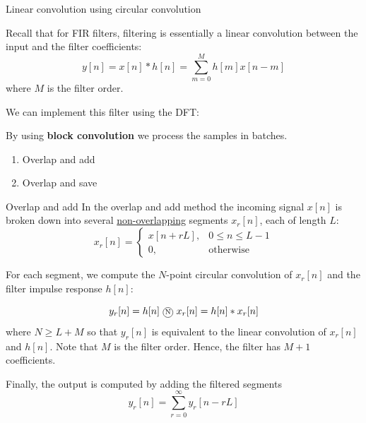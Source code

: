 \documentclass[10pt, handout]{beamer}
\begin{document}
\begin{frame}{Linear convolution using circular convolution}

	Recall that for FIR filters, filtering is essentially a linear convolution between the input and the filter coefficients:
	\begin{equation*}
		y[n] = x[n] \ast h[n] = \sum_{m =0}^{M} h[m]x[n-m]
	\end{equation*}
	where $M$ is the filter order.
	
	\vspace{0.25cm}
	We can implement this filter using the DFT:
	\begin{center}
		\resizebox{0.8\textwidth}{!}{}
	\end{center}

	By using \textbf{block convolution} we process the samples in batches.
	\begin{enumerate}
		\item Overlap and add
		\item Overlap and save
	\end{enumerate}
\end{frame}


\begin{frame}{Overlap and add}
In the overlap and add method the incoming signal $x[n]$ is broken down into several \underline{non-overlapping} segments $x_r[n]$, each of length $L$:
\begin{equation*}
	x_r[n] = \begin{cases}
	x[n + rL], & 0 \leq n \leq L-1\\
	0, & \text{otherwise}
	\end{cases}
\end{equation*}

For each segment, we compute the $N$-point circular convolution of $x_r[n]$ and the filter impulse response $h[n]$:

\begin{equation*}
	y_r[n] = h[n]~\encircle{N}~x_r[n] = h[n]\ast x_r[n]
\end{equation*}
where $N \geq L + M$ so that $y_r[n]$ is equivalent to the linear convolution of $x_r[n]$ and $h[n]$. Note that $M$ is the filter order. Hence, the filter has $M+1$ coefficients.

Finally, the output is computed by adding the filtered segments
\begin{equation*}
	y_r[n] = \sum_{r = 0}^{\infty} y_r[n - rL]
\end{equation*}
\end{frame}
\end{document}
